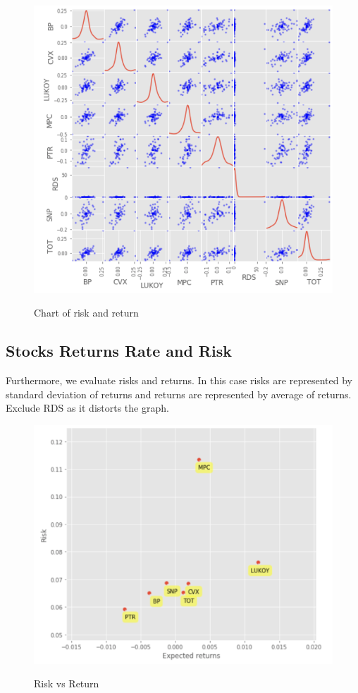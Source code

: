 \documentclass [a4paper, 11pt] {article}
\begin{document}
\begin{figure}[h]
\caption{Chart of risk and return}
\begin{center}
\includegraphics[scale=0.55]{matrix}
\label{fig:scat2}
\end{center}
\end{figure}
\clearpage

\subsection {Stocks Returns Rate and Risk}
Furthermore, we evaluate  risks and returns. In this case risks are represented by standard deviation of returns and returns are represented by average of returns.
Exclude RDS as it distorts the graph.\\

\begin{figure}[h]
\caption{Risk vs Return}
\includegraphics[scale=0.65]{return_risk}
\label{fig:scat4}
\end{figure}
\end{document}
